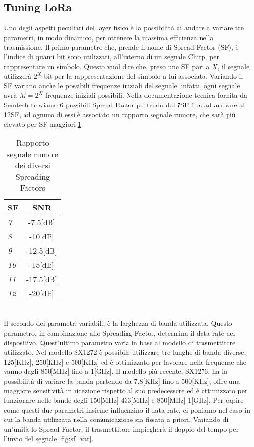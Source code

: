 \subsection{Tuning LoRa}
Uno degli aspetti peculiari del layer fisico è la possibilità di andare a
variare tre parametri, in modo dinamico, per ottenere la massima efficienza
nella trasmissione.
Il primo parametro che, prende il nome di Spread Factor (SF),
è l'indice di quanti bit sono utilizzati, all'interno di un segnale Chirp,
per rappresentare  un simbolo. Questo vuol dire che, preso uno 
SF pari a $X$, il segnale  utilizzerà $2^X$ bit per la rappresentazione del simbolo a lui
associato. Variando il SF variano anche le possibili frequenze iniziali del
segnale; infatti, ogni segnale avrà $M=2^X$ frequenze iniziali possibili.
Nella documentazione tecnica fornita da Semtech troviamo 6 possibili Spread
Factor partendo dal 7SF fino ad arrivare al 12SF, ad ognuno di essi è associato un
rapporto segnale rumore, che sarà più elevato per SF maggiori \ref{tab:SNR}. 
\begin{table}[h]
        \centering
        \begin{tabular}{l|c}
                \textbf{SF}  & SNR \\
                \hline
                \emph{7}  & -7.5[dB] \\
                \emph{8}  & -10[dB]  \\
                \emph{9}   & -12.5[dB]  \\
                \emph{10} & -15[dB] \\
                \emph{11} & -17.5[dB] \\
                \emph{12} & -20[dB] \\
        \end{tabular}
        \caption{Rapporto segnale rumore dei diversi Spreading Factors}
        \label{tab:SNR}
\end{table}
\\
Il secondo dei parametri variabili, è la larghezza di banda utilizzata. Questo
parametro, in  combinazione allo Spreading Factor, determina il data rate del dispositivo.
Quest'ultimo parametro varia in base al modello di
trasmettitore utilizzato. Nel modello SX1272 è possibile utilizzare tre lunghe
di banda diverse, 125[KHz],
250[KHz] e 500[KHz] ed è ottimizzato per lavorare nelle frequenze che vanno
dagli  850[MHz] fino a  1[GHz]. Il modello più recente, SX1276, ha la possibilità di variare
la banda partendo da 7.8[KHz] fino a 500[KHz], offre una maggiore sensitività in
ricezione rispetto al suo predecessore ed è ottimizzato per funzionare nelle
bande degli 150[MHz] 433[MHz] e 850[MHz]-1[GHz].
Per capire come questi due parametri insieme influenzino il data-rate, 
ci poniamo nel caso in cui la banda utilizzata nella comunicazione sia fissata a priori. 
Variando di un'unità lo Spread Factor,
il trasmettitore impiegherà il doppio del tempo per l'invio del segnale
\ref{fig:sf_var}.


